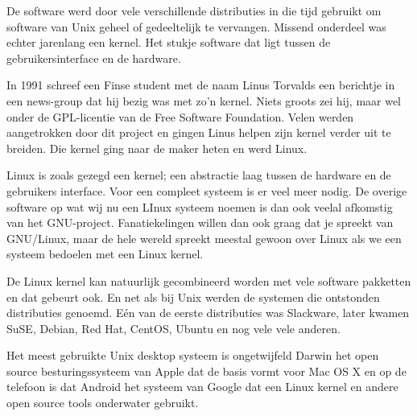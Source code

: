 De software werd door vele verschillende distributies in die tijd gebruikt om software van Unix geheel of gedeeltelijk
te vervangen. Missend onderdeel was echter jarenlang een kernel. Het stukje software dat ligt tussen de
gebruikersinterface en de hardware.\par

In 1991 schreef een Finse student met de naam Linus Torvalds een berichtje in een news-group dat hij bezig was met zo'n
kernel. Niets groots zei hij, maar wel onder de GPL-licentie van de Free Software Foundation. Velen werden aangetrokken
door dit project en gingen Linus helpen zijn kernel verder uit te breiden. Die kernel ging naar de maker heten en werd
Linux.\par

Linux is zoals gezegd een kernel; een abstractie laag tussen de hardware en de gebruikers interface. Voor een compleet systeem is er veel meer nodig. De overige software op wat wij nu een LInux systeem noemen is dan ook veelal afkomstig van het
GNU-project. Fanatiekelingen willen dan ook graag dat je spreekt van GNU/Linux, maar de hele wereld
spreekt meestal gewoon over Linux als we een systeem bedoelen met een Linux kernel.\par

De Linux kernel kan natuurlijk gecombineerd worden met vele software pakketten en dat gebeurt ook. En net als bij
Unix werden de systemen die ontstonden distributies genoemd. E\'en van de eerste distributies was Slackware, later
kwamen SuSE, Debian, Red Hat, CentOS, Ubuntu en nog vele vele anderen.\par

Het meest gebruikte Unix desktop systeem is ongetwijfeld Darwin het open source besturingssysteem van Apple dat de basis
vormt voor Mac OS X en op de telefoon is dat Android het systeem van Google dat een Linux kernel en andere open source
tools onderwater gebruikt.\par

